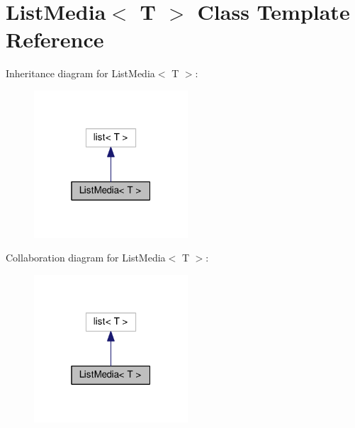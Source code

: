 \hypertarget{classListMedia}{\section{List\+Media$<$ T $>$ Class Template Reference}
\label{classListMedia}
}


Inheritance diagram for List\+Media$<$ T $>$\+:
\nopagebreak
\begin{figure}[H]
\begin{center}
\leavevmode
\includegraphics[width=163pt]{classListMedia__inherit__graph}
\end{center}
\end{figure}


Collaboration diagram for List\+Media$<$ T $>$\+:
\nopagebreak
\begin{figure}[H]
\begin{center}
\leavevmode
\includegraphics[width=163pt]{classListMedia__coll__graph}
\end{center}
\end{figure}
